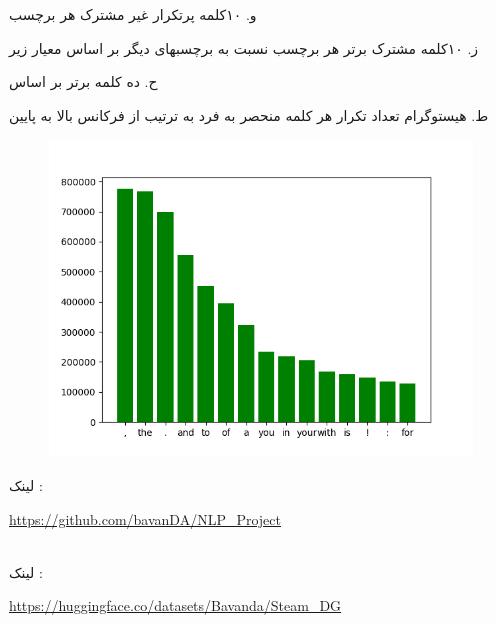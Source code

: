 \newpage

و.  ۱۰کلمه پرتکرار غیر مشترک هر برچسب
\begin{latin}
\begin{center}
    \fontsize{4pt}{7pt}\ttfamily
\end{center}
\end{latin}

ز.  ۱۰کلمه مشترک برتر هر برچسب نسبت به برچسبهای دیگر بر اساس معیار زیر
\begin{latin}
\begin{center}
  \fontsize{4pt}{7pt}\ttfamily
\end{center}
\end{latin}


ح. ده کلمه برتر بر اساس 
\begin{latin}
\begin{center}
  \fontsize{4pt}{7pt}\ttfamily
\end{center}
\end{latin}


\newpage

ط. هیستوگرام تعداد تکرار هر کلمه منحصر به فرد به ترتیب از فرکانس بالا به پایین
\begin{figure}[H]
    \centering
    \includegraphics[width=0.7\linewidth]{../stats/hist.png}
   \end{figure}
   
لینک  :
\\
 \begin{latin}
 \url{ https://github.com/bavanDA/NLP\_Project}
 \end{latin}
 

\\
لینک :
\\
 \begin{latin}
 \url{https://huggingface.co/datasets/Bavanda/Steam\_DG}
 \end{latin}
 
